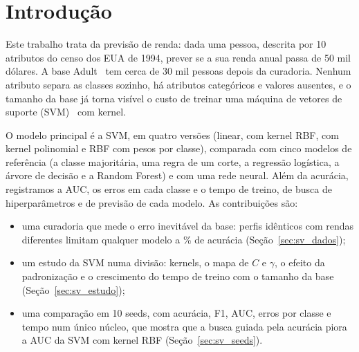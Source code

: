 \section{Introdução}

Este trabalho trata da previsão de renda: dada uma pessoa, descrita por 10 atributos do censo dos EUA de 1994, prever se a sua renda anual passa de 50 mil dólares. A base Adult~\cite{uci:adult,kohavi:96} tem cerca de 30 mil pessoas depois da curadoria. Nenhum atributo separa as classes sozinho, há atributos categóricos e valores ausentes, e o tamanho da base já torna visível o custo de treinar uma máquina de vetores de suporte (SVM)~\cite{boser:92,cortes:95} com kernel.

O modelo principal é a SVM, em quatro versões (linear, com kernel RBF, com kernel polinomial e RBF com pesos por classe), comparada com cinco modelos de referência (a classe majoritária, uma regra de um corte, a regressão logística, a árvore de decisão e a Random Forest) e com uma rede neural. Além da acurácia, registramos a AUC, os erros em cada classe e o tempo de treino, de busca de hiperparâmetros e de previsão de cada modelo. As contribuições são:
\begin{itemize}
  \item uma curadoria que mede o erro inevitável da base: perfis idênticos com rendas diferentes limitam qualquer modelo a \svTeto\% de acurácia (Seção~\ref{sec:sv_dados});
  \item um estudo da SVM numa divisão: kernels, o mapa de $C$ e $\gamma$, o efeito da padronização e o crescimento do tempo de treino com o tamanho da base (Seção~\ref{sec:sv_estudo});
  \item uma comparação em 10 seeds, com acurácia, F1, AUC, erros por classe e tempo num único núcleo, que mostra que a busca guiada pela acurácia piora a AUC da SVM com kernel RBF (Seção~\ref{sec:sv_seeds}).
\end{itemize}

